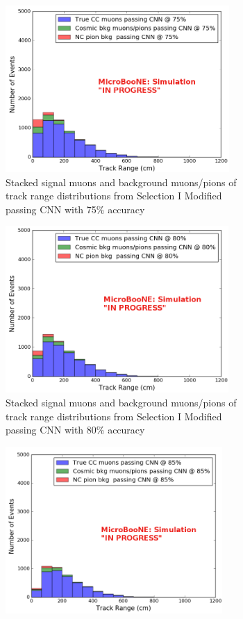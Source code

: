 \begin{figure}[htp!]
\centering
	\begin{subfigure}[b]{.45\textwidth}
	\includegraphics[width=\textwidth, height=2.5in]{figs/sel1mod_cnn_trackrange_acc75_0707.png}
	\caption{Stacked signal muons and background muons/pions of track range distributions from Selection I Modified passing CNN with 75\% accuracy}
	\label{fig:sel1mod_mupi_75stackedcnn}
	\end{subfigure}
	\quad
	\begin{subfigure}[b]{.45\textwidth}
	\includegraphics[width=\textwidth, height=2.5in]{figs/sel1mod_cnn_trackrange_acc80_0707.png}
	\caption{Stacked signal muons and background muons/pions of track range distributions from Selection I Modified passing CNN with 80\% accuracy}
	\label{fig:sel1mod_mupi_80stackedcnn}
	\end{subfigure}
	\quad
	\begin{subfigure}[b]{.45\textwidth}
	\includegraphics[width=\textwidth, height=2.5in]{figs/sel1mod_cnn_trackrange_acc85_0707.png}

\end{subfigure}
\end{figure}
